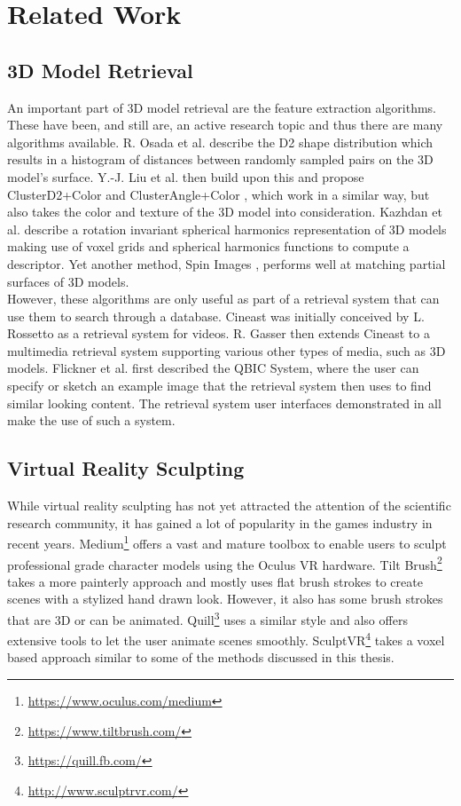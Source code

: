 \chapter{Related Work}

\section{3D Model Retrieval}

An important part of 3D model retrieval are the feature extraction algorithms. These have been, and still are, an active research topic and thus there are many algorithms available. R. Osada et al. describe the D2 shape distribution \cite{d2_shape_distribution} which results in a histogram of distances between randomly sampled pairs on the 3D model's surface. Y.-J. Liu et al. then build upon this and propose ClusterD2+Color and ClusterAngle+Color \cite{cluster_d2_color}, which work in a similar way, but also takes the color and texture of the 3D model into consideration. Kazhdan et al. describe a rotation invariant spherical harmonics representation of 3D models \cite{spherical_harmonics} making use of voxel grids and spherical harmonics functions to compute a descriptor. Yet another method, Spin Images \cite{spin_descriptor}, performs well at matching partial surfaces of 3D models.\\
However, these algorithms are only useful as part of a retrieval system that can use them to search through a database. Cineast was initially conceived by L. Rossetto \cite{cineast_rossetto} as a retrieval system for videos. R. Gasser then extends Cineast to a multimedia retrieval system \cite{cineast_gasser} supporting various other types of media, such as 3D models. Flickner et al. \cite{qbic_system} first described the QBIC System, where the user can specify or sketch an example image that the retrieval system then uses to find similar looking content. The retrieval system user interfaces demonstrated in \cite{cineast_gasser, 3d_model_retrieval_vranic, cluster_d2_color} all make the use of such a system.

\section{Virtual Reality Sculpting}

While virtual reality sculpting has not yet attracted the attention of the scientific research community, it has gained a lot of popularity in the games industry in recent years.
Medium\footnote{\url{https://www.oculus.com/medium}} offers a vast and mature toolbox to enable users to sculpt professional grade character models using the Oculus VR hardware.
Tilt Brush\footnote{\url{https://www.tiltbrush.com/}} takes a more painterly approach and mostly uses flat brush strokes to create scenes with a stylized hand drawn look. However, it also has some brush strokes that are 3D or can be animated. Quill\footnote{\url{https://quill.fb.com/}} uses a similar style and also offers extensive tools to let the user animate scenes smoothly. SculptVR\footnote{\url{http://www.sculptrvr.com/}} takes a voxel based approach similar to some of the methods discussed in this thesis.
